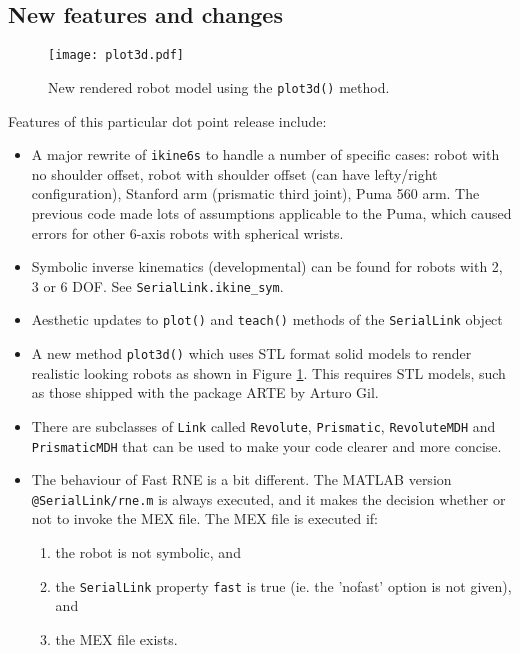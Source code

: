 \documentclass[a4paper]{report}
\begin{document}
\subsection{New features and changes}
\begin{figure}[t]
\centering
\texttt{[image: plot3d.pdf]}
\caption{New rendered robot model using the \texttt{plot3d()} method.}\label{fig:plot3d}
\end{figure}
Features of this particular dot point release include:
\begin{itemize}
\item A major rewrite of \texttt{ikine6s} to handle a number of specific cases: robot with no shoulder offset, robot with
shoulder offset (can have lefty/right configuration), Stanford arm (prismatic third joint), Puma 560 arm.  The previous code made lots
of assumptions applicable to the Puma, which caused errors for other 6-axis robots with spherical wrists.
\item Symbolic inverse kinematics (developmental) can be found for robots with 2, 3 or 6 DOF.  See \texttt{SerialLink.ikine\_sym}.
\item Aesthetic updates to \texttt{plot()} and \texttt{teach()} methods of the \texttt{SerialLink} object

\item A new method \texttt{plot3d()} which uses STL format solid models to render realistic looking robots as shown in Figure
\ref{fig:plot3d}.  This requires STL models,
such as those shipped with the package ARTE by Arturo Gil.

\item There are subclasses of \texttt{Link} called \texttt{Revolute}, \texttt{Prismatic}, \texttt{RevoluteMDH} and \texttt{PrismaticMDH} that can be used to make your
code clearer and more concise.
\item The behaviour of Fast RNE is a bit different.  The MATLAB version \texttt{@SerialLink/rne.m} is always executed, and it makes
the decision whether or not to invoke the MEX file.  The MEX file is executed if:
	\begin{enumerate}
	\item the robot is not symbolic, and
	\item the \texttt{SerialLink} property \texttt{fast} is true (ie. the 'nofast' option is not given), and
	\item the MEX file exists.
	\end{enumerate}
	

\end{itemize}
\end{document}
